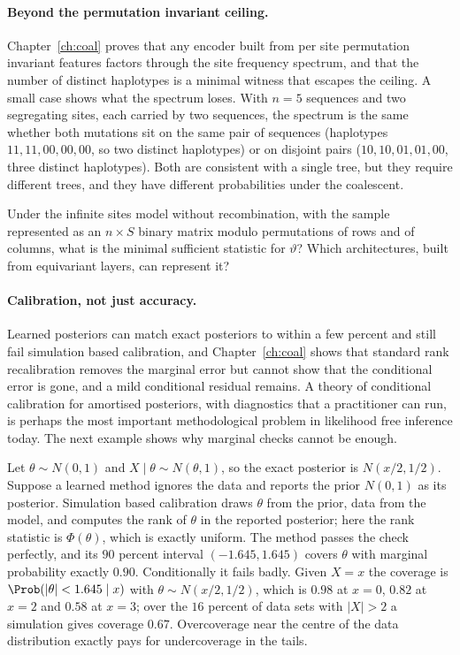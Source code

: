 \paragraph{Beyond the permutation invariant ceiling.} Chapter~\ref{ch:coal} proves that any encoder
built from per site permutation invariant features factors through the site frequency spectrum, and
that the number of distinct haplotypes is a minimal witness that escapes the ceiling. A small
case shows what the spectrum loses. With $n=5$ sequences and two segregating sites, each carried
by two sequences, the spectrum is the same whether both mutations sit on the same pair of
sequences (haplotypes $11,11,00,00,00$, so two distinct haplotypes) or on disjoint pairs
($10,10,01,01,00$, three distinct haplotypes). Both are consistent with a single tree, but they
require different trees, and they have different probabilities under the coalescent.

\begin{question}\label{future:q:minsuff}
Under the infinite sites model without recombination, with the sample represented as an $n\times S$
binary matrix modulo permutations of rows and of columns, what is the minimal sufficient statistic
for $\vartheta$? Which architectures, built from equivariant layers, can represent it?
\end{question}

\paragraph{Calibration, not just accuracy.} Learned posteriors can match exact posteriors to within
a few percent and still fail simulation based calibration, and Chapter~\ref{ch:coal} shows that
standard rank recalibration removes the marginal error but cannot show that the conditional error is gone, and
a mild conditional residual remains. A theory of conditional calibration for amortised posteriors, with
diagnostics that a practitioner can run, is perhaps the most important methodological problem in
likelihood free inference today. The next example shows why marginal checks cannot be enough.

\begin{example}\label{future:ex:calib}
Let $\theta\sim N(0,1)$ and $X\mid\theta\sim N(\theta,1)$, so the exact posterior is
$N(x/2,1/2)$. Suppose a learned method ignores the data and reports the prior $N(0,1)$ as its
posterior. Simulation based calibration \citep{future:cook2006} draws $\theta$ from the prior,
data from the model, and computes the rank of $\theta$ in the reported posterior; here the rank
statistic is $\Phi(\theta)$, which is exactly uniform. The method passes the check perfectly, and
its $90$ percent interval $(-1.645,1.645)$ covers $\theta$ with marginal probability exactly
$0.90$. Conditionally it fails badly. Given $X=x$ the coverage is
$\Prob(|\theta|<1.645\mid x)$ with $\theta\sim N(x/2,1/2)$, which is $0.98$ at $x=0$, $0.82$ at
$x=2$ and $0.58$ at $x=3$; over the $16$ percent of data sets with $|X|>2$ a simulation gives
coverage $0.67$. Overcoverage near the centre of the data distribution exactly pays for
undercoverage in the tails.
\end{example}

